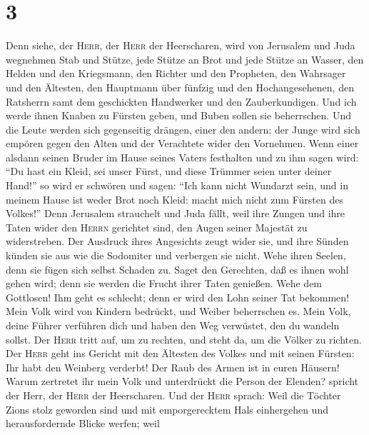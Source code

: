 \hypertarget{section-2}{%
\section{3}\label{section-2}}

 Denn siehe, der \textsc{Herr}, der \textsc{Herr} der
Heerscharen, wird von Jerusalem und Juda wegnehmen Stab und Stütze, jede
Stütze an Brot und jede Stütze an Wasser,  den Helden und
den Kriegsmann, den Richter und den Propheten, den Wahrsager und den
Ältesten,  den Hauptmann über fünfzig und den
Hochangesehenen, den Ratsherrn samt dem geschickten Handwerker und den
Zauberkundigen.  Und ich werde ihnen Knaben zu Fürsten
geben, und Buben sollen sie beherrschen.  Und die Leute
werden sich gegenseitig drängen, einer den andern; der Junge wird sich
empören gegen den Alten und der Verachtete wider den Vornehmen.
 Wenn einer alsdann seinen Bruder im Hause seines Vaters
festhalten und zu ihm sagen wird: ``Du hast ein Kleid, sei unser Fürst,
und diese Trümmer seien unter deiner Hand!''  so wird er
schwören und sagen: ``Ich kann nicht Wundarzt sein, und in meinem Hause
ist weder Brot noch Kleid: macht mich nicht zum Fürsten des Volkes!''
 Denn Jerusalem strauchelt und Juda fällt, weil ihre
Zungen und ihre Taten wider den \textsc{Herrn} gerichtet sind, den Augen
seiner Majestät zu widerstreben.  Der Ausdruck ihres
Angesichts zeugt wider sie, und ihre Sünden künden sie aus wie die
Sodomiter und verbergen sie nicht. Wehe ihren Seelen, denn sie fügen
sich selbst Schaden zu.  Saget den Gerechten, daß es
ihnen wohl gehen wird; denn sie werden die Frucht ihrer Taten genießen.
 Wehe dem Gottlosen! Ihm geht es schlecht; denn er wird
den Lohn seiner Tat bekommen!  Mein Volk wird von Kindern
bedrückt, und Weiber beherrschen es. Mein Volk, deine Führer verführen
dich und haben den Weg verwüstet, den du wandeln sollst. 
Der \textsc{Herr} tritt auf, um zu rechten, und steht da, um die Völker
zu richten.  Der \textsc{Herr} geht ins Gericht mit den
Ältesten des Volkes und mit seinen Fürsten: Ihr habt den Weinberg
verderbt! Der Raub des Armen ist in euren Häusern!  Warum
zertretet ihr mein Volk und unterdrückt die Person der Elenden? spricht
der Herr, der \textsc{Herr} der Heerscharen.  Und der
\textsc{Herr} sprach: Weil die Töchter Zions stolz geworden sind und mit
emporgerecktem Hals einhergehen und herausfordernde Blicke werfen; weil
